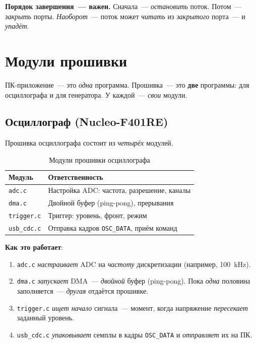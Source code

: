 \begin{keybox}
\textbf{Порядок завершения~--- важен.} Сначала~---
\emph{остановить} поток. Потом~--- \emph{закрыть} порты.
\emph{Наоборот}~--- поток может \emph{читать} из
\emph{закрытого} порта~--- и \emph{упадёт}.
\end{keybox}






\section{Модули прошивки}
\label{sec:arch-firmware-modules}

ПК-приложение~--- это \emph{одна} программа. Прошивка~---
это \textbf{две} программы: для осциллографа и для генератора.
У каждой~--- \emph{свои} модули.

\subsection{Осциллограф (Nucleo-F401RE)}

Прошивка осциллографа состоит из \emph{четырёх} модулей.

\begin{table}[htbp]
\centering
\caption{Модули прошивки осциллографа}
\label{tab:arch-osc-modules}
\small
\begin{tabularx}{\textwidth}{@{}l L@{}}
\toprule
\textbf{Модуль} & \textbf{Ответственность} \\
\midrule
\texttt{adc.c}     & Настройка ADC: частота, разрешение, каналы \\
\texttt{dma.c}     & Двойной буфер (ping-pong), прерывания \\
\texttt{trigger.c} & Триггер: уровень, фронт, режим \\
\texttt{usb\_cdc.c} & Отправка кадров \texttt{OSC\_DATA}, приём команд \\
\bottomrule
\end{tabularx}
\end{table}

\textbf{Как это работает}:

\begin{enumerate}
    \item \texttt{adc.c} \emph{настраивает} ADC на \emph{частоту}
          дискретизации (например, \SI{100}{\kilo\hertz}).
    \item \texttt{dma.c} \emph{запускает} DMA~--- \emph{двойной}
          буфер (ping-pong). Пока \emph{одна} половина
          заполняется~--- \emph{другая} отдаётся прошивке.
    \item \texttt{trigger.c} \emph{ищет} \emph{начало} сигнала~---
          момент, когда напряжение \emph{пересекает} заданный
          уровень.
    \item \texttt{usb\_cdc.c} \emph{упаковывает} семплы в кадры
          \texttt{OSC\_DATA} и \emph{отправляет} их на ПК.
\end{enumerate}

